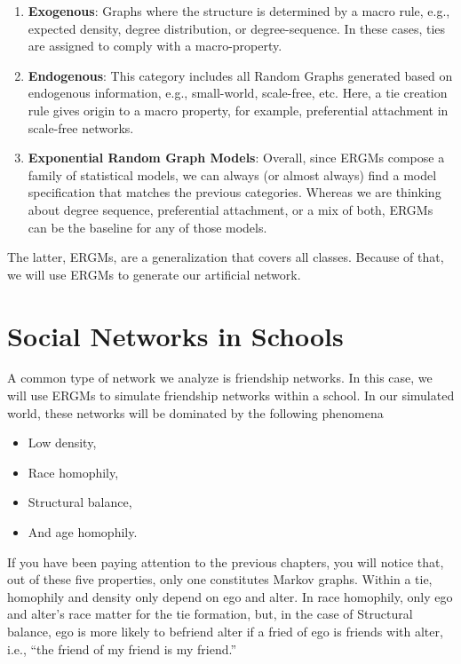\documentclass[
]{book}
\providecommand{\tightlist}{%
  \setlength{\itemsep}{0pt}\setlength{\parskip}{0pt}}
\begin{document}
\begin{enumerate}
\def\labelenumi{\arabic{enumi}.}
\item
  \textbf{Exogenous}: Graphs where the structure is determined by a macro rule, e.g.,
  expected density, degree distribution, or degree-sequence. In these cases,
  ties are assigned to comply with a macro-property.
\item
  \textbf{Endogenous}: This category includes all Random Graphs generated based
  on endogenous information, e.g., small-world, scale-free, etc. Here, a tie
  creation rule gives origin to a macro property, for example, preferential attachment
  in scale-free networks.
\item
  \textbf{Exponential Random Graph Models}: Overall, since ERGMs compose a family
  of statistical models, we can always (or almost always) find a model specification
  that matches the previous categories. Whereas we are thinking about degree sequence,
  preferential attachment, or a mix of both, ERGMs can be the baseline for any of
  those models.
\end{enumerate}

The latter, ERGMs, are a generalization that covers all classes. Because of that,
we will use ERGMs to generate our artificial network.

\hypertarget{social-networks-in-schools}{%
\section{Social Networks in Schools}\label{social-networks-in-schools}}

A common type of network we analyze is friendship networks. In this case,
we will use ERGMs to simulate friendship networks within a school. In our
simulated world, these networks will be dominated by the following phenomena

\begin{itemize}
\tightlist
\item
  Low density,
\item
  Race homophily,
\item
  Structural balance,
\item
  And age homophily.
\end{itemize}

If you have been paying attention to the previous chapters, you will notice that,
out of these five properties, only one constitutes Markov graphs. Within a tie,
homophily and density only depend on ego and alter. In race homophily, only ego
and alter's race matter for the tie formation, but, in the case of Structural
balance, ego is more likely to befriend alter if a fried of ego is friends with alter,
i.e., ``the friend of my friend is my friend.''
\end{document}
